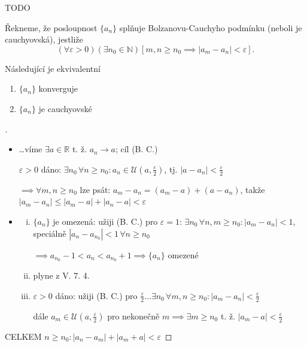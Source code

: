 TODO

\begin{definice}
  Řekneme, že posloupnost $\{a_n\}$ splňuje Bolzanovu-Cauchyho podmínku (neboli je cauchyovská), jestliže
  $$(\forall \varepsilon >0)(\exists n_0 \in \mathbb N)[m, n \geq n_0 \implies |a_m-a_n|<\varepsilon].$$
\end{definice}

\begin{veta}\label{7bckonv}
  Následující je ekvivalentní
  \begin{enumerate}
    \item $\{a_n\}$ konverguje
    \item $\{a_n\}$ je cauchyovské
  \end{enumerate}
\end{veta}

\begin{proof}[]
  \begin{itemize}
    \item[(1) $\implies$ (2)] \dots víme $\exists a \in \mathbb R$ t. ž. $a_n \to a$; cíl (B. C.)

    $\varepsilon > 0$ dáno: $\exists n_0 \,\forall n \geq n_0: a_n \in \mathscr U(a, \frac{\varepsilon}{2})$, tj. $|a-a_n|<\frac{\varepsilon}{2}$

     $\implies \forall m, n \geq n_0$ lze psát: $a_m-a_n = (a_m-a)+(a-a_n)$, takže $|a_m-a_n|\leq |a_m-a|+|a_n-a|<\varepsilon$
     \item[(2) $\implies$ (1)] \begin{enumerate}[i.]
       \item $\{a_n\}$ je omezená: užiji (B. C.) pro $\varepsilon=1$: $\exists n_0 \,\forall n, m \geq n_0: |a_m-a_n| < 1$, speciálně $|a_n-a_{n_0}|< 1 \,\forall n \geq n_0$

       $\implies a_{n_0} -1 < a_n < a_{n_0} + 1 \implies \{a_n\}$ omezené
       \item plyne z V. 7. 4.
       \item $\varepsilon >0$ dáno: užiji (B. C.) pro $\frac{\varepsilon}{2} \dots \exists n_0 \,\forall m, n \geq n_0: |a_m-a_n| < \frac{\varepsilon}{2}$

       dále $a_m \in \mathscr U(a, \frac{\varepsilon}{2})$ pro nekonečně $m \implies \exists m \geq n_0$ t. ž. $|a_m-a| < \frac{\varepsilon}{2}$

   \end{enumerate}
  \end{itemize}
  CELKEM $n \geq n_0:|a_n-a_m|+|a_m+a|<\varepsilon$
\end{proof}


